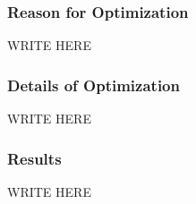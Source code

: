 
\subsubsection{Reason for Optimization}

WRITE HERE

\subsubsection{Details of Optimization}

WRITE HERE

\subsubsection{Results}

WRITE HERE
